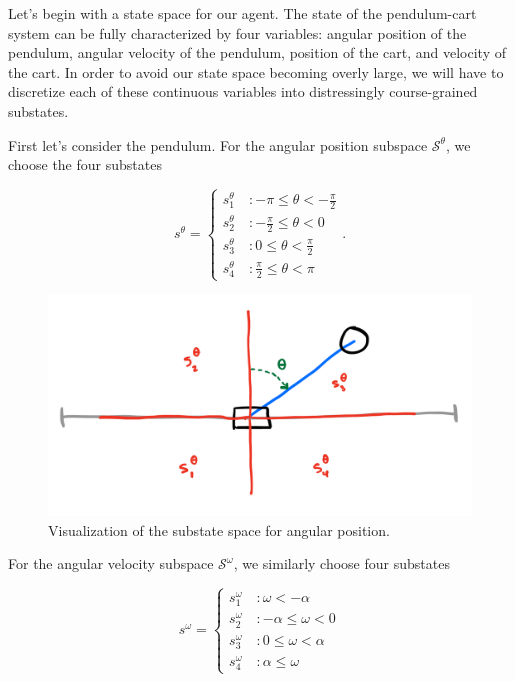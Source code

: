 \documentclass[12pt]{article}
\begin{document}
Let's begin with a state space for our agent. The state of the pendulum-cart system can be fully characterized by four variables: angular position of the pendulum, angular velocity of the pendulum, position of the cart, and velocity of the cart. In order to avoid our state space becoming overly large, we will have to discretize each of these continuous variables into distressingly course-grained substates.

First let's consider the pendulum. For the angular position subspace $\mathscr{S}^\theta$, we choose the four substates

\begin{equation}
s^\theta = \left\{
\begin{array}{lr}
s_1^\theta \quad : -\pi \leq \theta < -\frac{\pi}{2} \\
s_2^\theta \quad : -\frac{\pi}{2} \leq \theta < 0 \\
s_3^\theta \quad : 0 \leq \theta < \frac{\pi}{2} \\
s_4^\theta \quad : \frac{\pi}{2} \leq \theta < \pi
\end{array}
\right.
.
\end{equation}

\begin{figure}
\center
\includegraphics[width=0.9\linewidth]{substates.png}
\caption{Visualization of the substate space for angular position.}
\label{fig:substates}
\end{figure}

For the angular velocity subspace $\mathscr{S}^\omega$, we similarly choose four substates

\begin{equation}
s^\omega = \left\{
\begin{array}{lr}
s_1^\omega \quad : \omega < -\alpha \\
s_2^\omega \quad : -\alpha \leq \omega < 0 \\
s_3^\omega \quad : 0 \leq \omega < \alpha \\
s_4^\omega \quad : \alpha \leq \omega
\end{array}
\right.
\end{equation}
\end{document}

